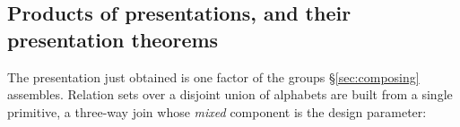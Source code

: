 \subsection{Products of presentations, and their presentation theorems}\label{sec:constructions}

The presentation just obtained is one factor of the groups
\S\ref{sec:composing} assembles.  Relation sets over a disjoint union
of alphabets are built from a single primitive, a three-way join whose
\emph{mixed} component is the design parameter:

\begin{code}%
\>[0]\AgdaSpace{}%
\AgdaSpace{}%
\AgdaSymbol{(}\AgdaSpace{}%
\AgdaSymbol{:}\AgdaSpace{}%
\AgdaSpace{}%
\AgdaSymbol{)}\AgdaSpace{}%
\AgdaSymbol{(}\AgdaSpace{}%
\AgdaSymbol{:}\AgdaSpace{}%
\AgdaSpace{}%
\AgdaSymbol{)}\AgdaSpace{}%
\AgdaSymbol{(}\AgdaSpace{}%
\AgdaSymbol{:}\AgdaSpace{}%
\AgdaSpace{}%
\AgdaSymbol{(}\AgdaSpace{}%
\AgdaSpace{}%
\AgdaSymbol{))}\AgdaSpace{}%
\AgdaSymbol{:}\AgdaSpace{}%
\AgdaSpace{}%
\AgdaSymbol{(}\AgdaSpace{}%
\AgdaSpace{}%
\AgdaSymbol{)}\AgdaSpace{}%
\<%
\\
\>[0][@{}l@{\AgdaIndent{0}}]%
\>[2]%
\>[8]\AgdaSymbol{:}\AgdaSpace{}%
\AgdaSpace{}%
\AgdaSpace{}%
\AgdaSpace{}%
\AgdaSpace{}%
\AgdaSymbol{(}\AgdaSpace{}%
\AgdaSpace{}%
\AgdaSpace{}%
\AgdaSpace{}%
\AgdaSymbol{)}\AgdaSpace{}%
\AgdaOperator{\AgdaFunction{[}}\AgdaSpace{}%
\AgdaSpace{}%
\AgdaOperator{\AgdaFunction{]ₗ}}\AgdaSpace{}%
\AgdaOperator{\AgdaFunction{[}}\AgdaSpace{}%
\AgdaSpace{}%
\AgdaOperator{\AgdaFunction{]ₗ}}\<%
\\
%
\>[2]\AgdaSpace{}%
\AgdaSymbol{:}\AgdaSpace{}%
\AgdaSpace{}%
\AgdaSpace{}%
\AgdaSpace{}%
\AgdaSpace{}%
\AgdaSymbol{(}\AgdaSpace{}%
\AgdaSpace{}%
\AgdaSpace{}%
\AgdaSpace{}%

\end{code}
